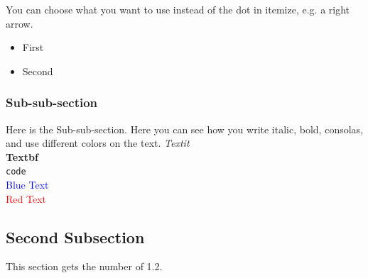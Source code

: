 \documentclass[../main.tex]{subfiles}
\begin{document}
\newpage %

\noindent
You can choose what you want to use instead of the dot in itemize, e.g. a right arrow.
\begin{itemize}[$\rightarrow$]
    \item First
    \item Second
\end{itemize}\par\vspace{3mm}

\subsubsection{Sub-sub-section}
\noindent
Here is the Sub-sub-section. Here you can see how you write italic, bold, consolas, and use different colors on the text.
\noindent
\textit{Textit}\\
\textbf{Textbf}\\
\texttt{code}\\
\textcolor{blue}{Blue Text}\\
\textcolor{red}{Red Text}\par\vspace{5mm}


\subsection{Second Subsection}
\noindent
This section gets the number of 1.2.
\end{document}
